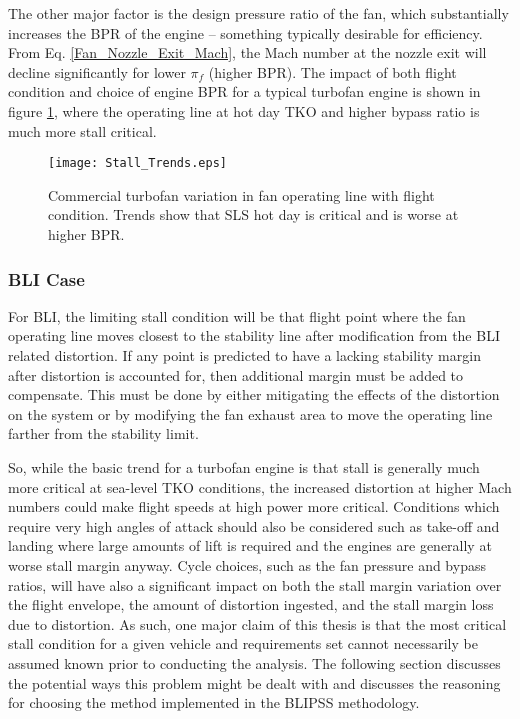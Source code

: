 			The other major factor is the design pressure ratio of the fan, which substantially increases the BPR of the engine -- something typically desirable for efficiency.  From Eq. \ref{Fan_Nozzle_Exit_Mach}, the Mach number at the nozzle exit will decline significantly for lower $\pi_f$ (higher BPR).  The impact of both flight condition and choice of engine BPR for a typical turbofan engine is shown in figure \ref{Stall_Trends}, where the operating line at hot day TKO and higher bypass ratio is much more stall critical.
			\begin{figure}[htp]
				\centering
				\texttt{[image: Stall\_Trends.eps]}
				\caption{Commercial turbofan variation in fan operating line with flight condition.  Trends show that SLS hot day is critical and is worse at higher BPR.}
				\label{Stall_Trends}
			\end{figure}
			
			\subsubsection{BLI Case}
				For BLI, the limiting stall condition will be that flight point where the fan operating line moves closest to the stability line after modification from the BLI related distortion.  If any point is predicted to have a lacking stability margin after distortion is accounted for, then additional margin must be added to compensate.  This must be done by either mitigating the effects of the distortion on the system or by modifying the fan exhaust area to move the operating line farther from the stability limit.  
				
				So, while the basic trend for a turbofan engine is that stall is generally much more critical at sea-level TKO conditions, the increased distortion at higher Mach numbers could make flight speeds at high power more critical.  Conditions which require very high angles of attack should also be considered such as take-off and landing where large amounts of lift is required and the engines are generally at worse stall margin anyway.  Cycle choices, such as the fan pressure and bypass ratios, will have also a significant impact on both the stall margin variation over the flight envelope, the amount of distortion ingested, and the stall margin loss due to distortion.  As such, one major claim of this thesis is that the most critical stall condition for a given vehicle and requirements set cannot necessarily be assumed known prior to conducting the analysis.  The following section discusses the potential ways this problem might be dealt with and discusses the reasoning for choosing the method implemented in the BLIPSS methodology.  
				
